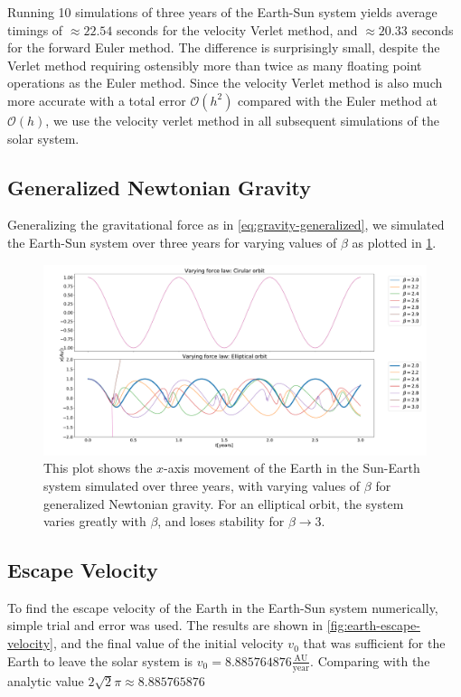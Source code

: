 \documentclass[../main.tex]{subfiles}
\begin{document}
Running 10 simulations of three years of the Earth-Sun system yields average timings of $\approx 22.54$ seconds for the velocity Verlet method, and $\approx 20.33$ seconds for the forward Euler method. The difference is surprisingly small, despite the Verlet method requiring ostensibly more than twice as many floating point operations as the Euler method. Since the velocity Verlet method is also much more accurate with a total error $\mathcal{O}(h^2)$ compared with the Euler method at $\mathcal{O}(h)$, we use the velocity verlet method in all subsequent simulations of the solar system.

\subsection{Generalized Newtonian Gravity}

Generalizing the gravitational force as in \cref{eq:gravity-generalized}, we simulated the Earth-Sun system over three years for varying values of $\beta$ as plotted in \cref{fig:varying-beta}.

\begin{figure}[htb!]
    \centering
    \includegraphics[trim=0cm 0.cm 0.cm 0.cm, clip,width=\textwidth]{../figures/varying_force.pdf}
    \caption{This plot shows the $x$-axis movement of the Earth in the Sun-Earth system simulated over three years, with varying values of $\beta$ for generalized Newtonian gravity. For an elliptical orbit, the system varies greatly with $\beta$, and loses stability for $\beta \xrightarrow{} 3$.}
    \label{fig:varying-beta}
\end{figure}

\subsection{Escape Velocity}

To find the escape velocity of the Earth in the Earth-Sun system numerically, simple trial and error was used. The results are shown in \cref{fig:earth-escape-velocity}, and the final value of the initial velocity $v_0$ that was sufficient for the Earth to leave the solar system is $v_0 = 8.885764876 \frac{\text{AU}}{\text{year}}$. Comparing with the analytic value $2 \sqrt{2} \pi \approx 8.885765876$
\end{document}
